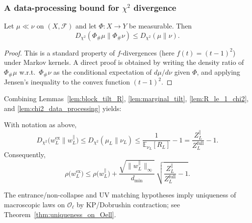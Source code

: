 \subsubsection{A data-processing bound for \texorpdfstring{$\chi^2$}{chi2} divergence}

\begin{lemma}\label{lem:chi2_data_processing}
Let $\mu\ll\nu$ on $(X,\mathcal F)$ and let $\Phi:X\to Y$ be measurable.
Then
\[
D_{\chi^2}(\Phi_{\#}\mu\|\Phi_{\#}\nu)\le D_{\chi^2}(\mu\|\nu).
\]
\end{lemma}

\begin{proof}
This is a standard property of $f$-divergences (here $f(t)=(t-1)^2$) under Markov kernels.
A direct proof is obtained by writing the density ratio of $\Phi_{\#}\mu$ w.r.t.\ $\Phi_{\#}\nu$ as the conditional
expectation of $d\mu/d\nu$ given $\Phi$, and applying Jensen's inequality to the convex function $(t-1)^2$.
\end{proof}

Combining Lemmas~\ref{lem:block_tilt_R}, \ref{lem:marginal_tilt}, \ref{lem:R_le_1_chi2}, and \ref{lem:chi2_data_processing} yields:

\begin{proposition}\label{prop:rho_transfer_block_integral}
With notation as above,
\[
D_{\chi^2}\!\bigl(w_L^{\mathrm{ex}}\|w_L^{\parallel}\bigr)
\le D_{\chi^2}(\mu_L\|\nu_L)
\le \frac{1}{\mathbb E_{\nu_L}[R_L]}-1
=\frac{Z_L^{\parallel}}{Z_L^{\mathrm{full}}}-1.
\]
Consequently,
\begin{equation}\label{eq:rho_transfer_block_final}
\rho\bigl(w_L^{\mathrm{ex}}\bigr)
\le
\rho\bigl(w_L^{\parallel}\bigr)
+
\frac{\sqrt{\|w_L^{\parallel}\|_{\infty}}}{d_{\min}}\,
\sqrt{\frac{Z_L^{\parallel}}{Z_L^{\mathrm{full}}}-1}.
\end{equation}
\end{proposition}

\begin{remark}
The entrance/non-collapse and UV matching hypotheses imply uniqueness of macroscopic laws on $\mathcal O_{\ell}$ by KP/Dobrushin contraction;
see Theorem~\ref{thm:uniqueness_on_Oell}.
\end{remark}

